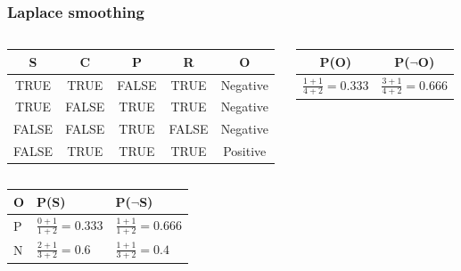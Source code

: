 \documentclass[aspectratio=169, 10pt]{beamer}
\begin{document}
\begin{frame}[t]
    \frametitle{Laplace smoothing}

    \begin{columns}[]
        \begin{column}[]{0.5\textwidth}
            \begin{table}[]
                \small
                \begin{tabular}{cccc|c}
                \textbf{S} & \textbf{C} & \textbf{P} & \textbf{R} & \textbf{O} \\ \hline
                TRUE       & TRUE       & FALSE      & TRUE       & Negative   \\
                TRUE       & FALSE      & TRUE       & TRUE       & Negative   \\
                FALSE      & FALSE      & TRUE       & FALSE      & Negative   \\
                FALSE      & TRUE       & TRUE       & TRUE       & Positive  
                \end{tabular}
            \end{table}
        \end{column}
        \begin{column}[]{0.5\textwidth}
            \begin{table}[]
                \small
                \begin{tabular}{cc}
                P(O) & P($\neg$O) \\ \hline
                $\frac{1+1}{4+2}=0.333$ & $\frac{3+1}{4+2}=0.666$ \\
                \end{tabular}
            \end{table}
        \end{column}
    \end{columns}

    \begin{columns}
        \begin{column}{0.5\textwidth}
            \begin{table}[]
                \small
                \begin{tabular}{lll}
                O & P(S) & P($\neg$S) \\ \hline
                P & $\frac{0+1}{1+2}=0.333$ & $\frac{1+1}{1+2}=0.666$ \\
                N & $\frac{2+1}{3+2}=0.6$ & $\frac{1+1}{3+2}=0.4$ \\
                \end{tabular}
            \end{table}


\end{column}
\end{columns}
\end{frame}
\end{document}
